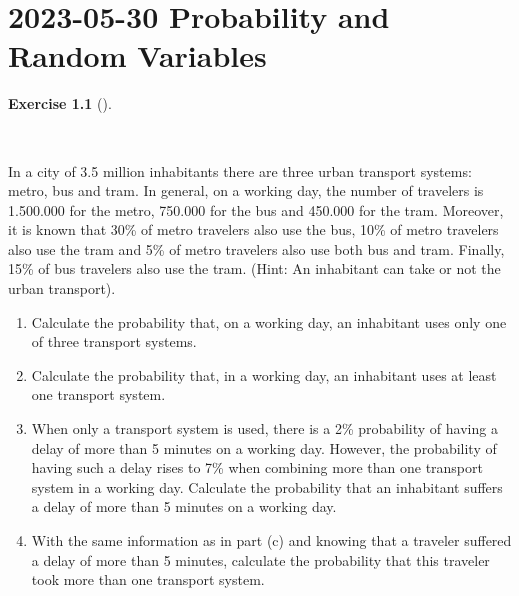 \documentclass[
  a4paper,
]{scrreport}
\theoremstyle{definition}
\newtheorem{exercise}{Exercise}[chapter]
\theoremstyle{remark}
\begin{document}

\hypertarget{probability-and-random-variables-3}{%
\chapter{\texorpdfstring{2023-05-30 Probability and Random
Variables}{2023-05-30  Probability and Random Variables}}\label{probability-and-random-variables-3}}

\begin{exercise}[]\protect\hypertarget{exr-1}{}\label{exr-1}

~

In a city of 3.5 million inhabitants there are three urban transport
systems: metro, bus and tram. In general, on a working day, the number
of travelers is 1.500.000 for the metro, 750.000 for the bus and 450.000
for the tram. Moreover, it is known that 30\% of metro travelers also
use the bus, 10\% of metro travelers also use the tram and 5\% of metro
travelers also use both bus and tram. Finally, 15\% of bus travelers
also use the tram. (Hint: An inhabitant can take or not the urban
transport).

\begin{enumerate}
\def\labelenumi{\alph{enumi}.}
\item
  Calculate the probability that, on a working day, an inhabitant uses
  only one of three transport systems.
\item
  Calculate the probability that, in a working day, an inhabitant uses
  at least one transport system.
\item
  When only a transport system is used, there is a 2\% probability of
  having a delay of more than 5 minutes on a working day. However, the
  probability of having such a delay rises to 7\% when combining more
  than one transport system in a working day. Calculate the probability
  that an inhabitant suffers a delay of more than 5 minutes on a working
  day.
\item
  With the same information as in part (c) and knowing that a traveler
  suffered a delay of more than 5 minutes, calculate the probability
  that this traveler took more than one transport system.
\end{enumerate}

\begin{tcolorbox}[enhanced jigsaw, colback=white, title=\textcolor{quarto-callout-tip-color}{\faLightbulb}\hspace{0.5em}{Solution}, arc=.35mm, colbacktitle=quarto-callout-tip-color!10!white, breakable, leftrule=.75mm, colframe=quarto-callout-tip-color-frame, opacitybacktitle=0.6, left=2mm, toptitle=1mm, bottomtitle=1mm, titlerule=0mm, rightrule=.15mm, bottomrule=.15mm, toprule=.15mm, opacityback=0, coltitle=black]


\end{tcolorbox}
\end{exercise}
\end{document}
